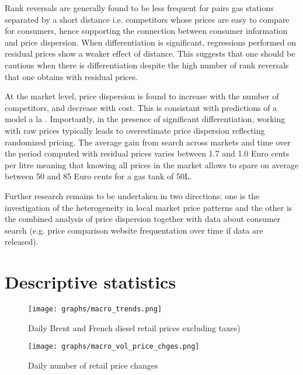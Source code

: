 \documentclass[english]{article}
\begin{document}
{{Rank reversals are generally found to be less frequent for pairs gas stations separated by a short distance i.e. competitors whose prices are easy to compare for consumers, hence supporting the connection between consumer information and price dispersion. When differentiation is significant, regressions performed on residual prices show a weaker effect of distance. This suggests that one should be cautious when there is differentiation despite the high number of rank reversals that one obtains with residual prices.

At the market level, price dispersion is found to increase with the number of competitors, and decrease with cost. This is consistant with predictions of a model a la \cite{VAR80}. Importantly, in the presence of significant differentiation, working with raw prices typically leads to overestimate price dispersion reflecting randomized pricing. The average gain from search across markets and time over the period computed with residual prices varies between 1.7 and 1.0 Euro cents per litre meaning that knowing all prices in the market allows to spare on average between 50 and 85 Euro cents for a gas tank of 50L.

Further research remains to be undertaken in two directions: one is the investigation of the heterogeneity in local market price patterns and the other is the combined analysis of price dispersion together with data about consumer search (e.g. price comparison website frequentation over time if data are released).

\newpage



\newpage

\appendix

\section{Descriptive statistics}

\begin{figure}[!h]
    \caption{Daily Brent and French diesel retail prices excluding taxes)}
	\centering
		\texttt{[image: graphs/macro\_trends.png]}
\label{fig:macro_trends}
\end{figure}

\begin{figure}[!h]
    \caption{Daily number of retail price changes}
	\centering
		\texttt{[image: graphs/macro\_vol\_price\_chges.png]}
\label{fig:macro_vol_price_chges}
\end{figure}

}}
\end{document}
